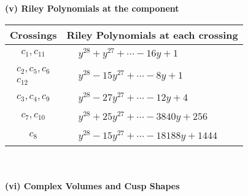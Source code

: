 \documentclass[1p]{elsarticle_modified}
\theoremstyle{definition}
\begin{document}
\newpage\renewcommand{\arraystretch}{1}
\flushleft \textbf{(v) Riley Polynomials at the component}\newline \\
\begin{tabular}{m{50pt}|m{274pt}}
Crossings & \hspace{64pt}Riley Polynomials at each crossing \\
\hline $$\begin{aligned}c_{1},c_{11}\end{aligned}$$&$\begin{aligned}
&y^{28}+y^{27}+\cdots-16 y+1
\end{aligned}$\\
\hline $$\begin{aligned}c_{2},c_{5},c_{6}\\c_{12}\end{aligned}$$&$\begin{aligned}
&y^{28}-15 y^{27}+\cdots-8 y+1
\end{aligned}$\\
\hline $$\begin{aligned}c_{3},c_{4},c_{9}\end{aligned}$$&$\begin{aligned}
&y^{28}-27 y^{27}+\cdots-12 y+4
\end{aligned}$\\
\hline $$\begin{aligned}c_{7},c_{10}\end{aligned}$$&$\begin{aligned}
&y^{28}+25 y^{27}+\cdots-3840 y+256
\end{aligned}$\\
\hline $$\begin{aligned}c_{8}\end{aligned}$$&$\begin{aligned}
&y^{28}-15 y^{27}+\cdots-18188 y+1444
\end{aligned}$\\
\hline
\end{tabular}\\~\\
\newpage\flushleft \textbf{(vi) Complex Volumes and Cusp Shapes}
\end{document}
